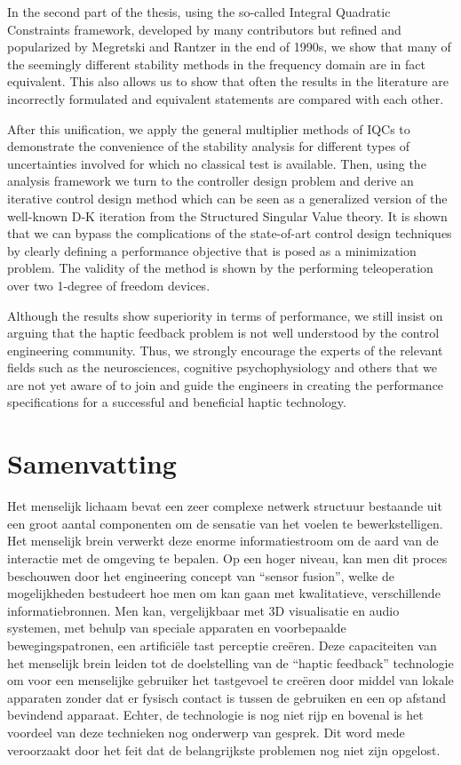 In the second part of the thesis, using the so-called Integral Quadratic Constraints framework, developed by many contributors but 
refined and popularized by Megretski and Rantzer in the end of 1990s, we show that many of the seemingly different stability methods in 
the frequency domain are in fact equivalent. This also allows us to show that often the results in the literature are incorrectly 
formulated and equivalent statements are compared with each other. 

After this unification, we apply the general multiplier methods of IQCs to demonstrate the convenience of the stability analysis for 
different types of uncertainties involved for which no classical test is available. Then, using the analysis framework we turn to the 
controller design problem and derive an iterative control design method which can be seen as a generalized version of  the well-known D-K 
iteration from the Structured Singular Value theory. It is shown that we can bypass the complications of the state-of-art control design 
techniques by clearly defining a performance objective that is posed as a minimization problem. The validity of the method is shown by 
the performing teleoperation over two 1-degree of freedom devices. 

Although the results show superiority in terms of performance, we still insist on arguing that the haptic feedback problem is not well 
understood by the control engineering community. Thus, we strongly encourage the experts of the relevant fields such as the neurosciences, 
cognitive psychophysiology and others that we are not yet aware of to join and guide the engineers in creating the performance 
specifications for a successful and beneficial haptic technology.
%
\chapter{Samenvatting}

Het menselijk lichaam bevat een zeer complexe netwerk structuur bestaande uit een groot aantal componenten om de sensatie van het voelen 
te bewerkstelligen. Het menselijk brein verwerkt deze enorme informatiestroom om de aard van de interactie met de omgeving te bepalen. Op 
een hoger niveau, kan men dit proces beschouwen door het engineering concept van \enquote{sensor fusion}, welke de mogelijkheden bestudeert hoe men 
om kan gaan met kwalitatieve, verschillende informatiebronnen. Men kan, vergelijkbaar met 3D visualisatie en audio systemen, met behulp van 
speciale apparaten en voorbepaalde bewegingspatronen, een artificiële tast perceptie creëren. Deze capaciteiten van het menselijk brein 
leiden tot de doelstelling van de \enquote{haptic feedback} technologie om voor een menselijke gebruiker het tastgevoel te creëren door middel van 
lokale apparaten zonder dat er fysisch contact is tussen de gebruiken en een op afstand bevindend apparaat. Echter, de technologie is nog 
niet rijp en bovenal is het voordeel van deze technieken nog onderwerp van gesprek. Dit word mede veroorzaakt door het feit dat de 
belangrijkste problemen nog niet zijn opgelost.


